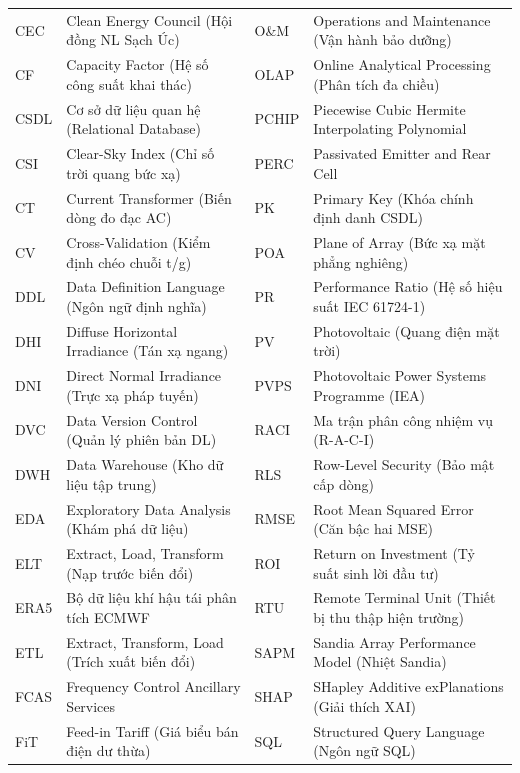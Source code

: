 \documentclass[12pt, a4paper]{report}
\begin{document}
\begin{table}[H]
\begin{tabularx}{\textwidth}{@{} l >{\raggedright\arraybackslash}X @{\hspace{8pt}} l >{\raggedright\arraybackslash}X @{}}
CEC        & Clean Energy Council (Hội đồng NL Sạch Úc)      & O\&M      & Operations and Maintenance (Vận hành bảo dưỡng) \\
CF         & Capacity Factor (Hệ số công suất khai thác)     & OLAP      & Online Analytical Processing (Phân tích đa chiều) \\
CSDL       & Cơ sở dữ liệu quan hệ (Relational Database)     & PCHIP     & Piecewise Cubic Hermite Interpolating Polynomial \\
CSI        & Clear-Sky Index (Chỉ số trời quang bức xạ)      & PERC      & Passivated Emitter and Rear Cell \\
CT         & Current Transformer (Biến dòng đo đạc AC)       & PK        & Primary Key (Khóa chính định danh CSDL) \\
CV         & Cross-Validation (Kiểm định chéo chuỗi t/g)     & POA       & Plane of Array (Bức xạ mặt phẳng nghiêng) \\
DDL        & Data Definition Language (Ngôn ngữ định nghĩa)  & PR        & Performance Ratio (Hệ số hiệu suất IEC 61724-1) \\
DHI        & Diffuse Horizontal Irradiance (Tán xạ ngang)    & PV        & Photovoltaic (Quang điện mặt trời) \\
DNI        & Direct Normal Irradiance (Trực xạ pháp tuyến)   & PVPS      & Photovoltaic Power Systems Programme (IEA) \\
DVC        & Data Version Control (Quản lý phiên bản DL)     & RACI      & Ma trận phân công nhiệm vụ (R-A-C-I) \\
DWH        & Data Warehouse (Kho dữ liệu tập trung)          & RLS       & Row-Level Security (Bảo mật cấp dòng) \\
EDA        & Exploratory Data Analysis (Khám phá dữ liệu)    & RMSE      & Root Mean Squared Error (Căn bậc hai MSE) \\
ELT        & Extract, Load, Transform (Nạp trước biến đổi)   & ROI       & Return on Investment (Tỷ suất sinh lời đầu tư) \\
ERA5       & Bộ dữ liệu khí hậu tái phân tích ECMWF          & RTU       & Remote Terminal Unit (Thiết bị thu thập hiện trường) \\
ETL        & Extract, Transform, Load (Trích xuất biến đổi)  & SAPM      & Sandia Array Performance Model (Nhiệt Sandia) \\
FCAS       & Frequency Control Ancillary Services            & SHAP      & SHapley Additive exPlanations (Giải thích XAI) \\
FiT        & Feed-in Tariff (Giá biểu bán điện dư thừa)      & SQL       & Structured Query Language (Ngôn ngữ SQL) \\

\end{tabularx}
\end{table}
\end{document}
